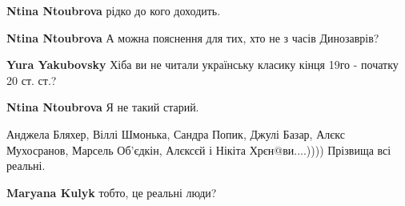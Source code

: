\begin{itemize}
\begin{itemize}
\textbf{Ntina Ntoubrova} рідко до кого доходить.

 
\textbf{Ntina Ntoubrova} А можна пояснення для тих, хто не з часів Динозаврів?

 
\textbf{Yura Yakubovsky} Хіба ви не читали українську класику кінця 19го - початку 20 ст. ст.?

 
\textbf{Ntina Ntoubrova} Я не такий старий.
\end{itemize}

 

Анджела Бляхер, Віллі Шмонька, Сандра Попик, Джулі Базар, Алєкс Мухосранов,
Марсель Об'єдкін, Алєксєй і Нікіта Хрєн@ви....)))) Прізвища всі реальні.

\begin{itemize}
 
\textbf{Maryana Kulyk} тобто, це реальні люди?

 

\end{itemize}
\end{itemize}
